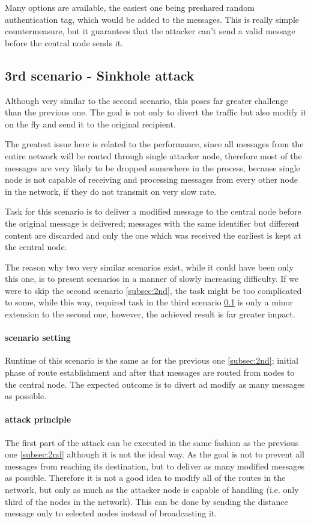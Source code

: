 \documentclass[
  digital, %
  table,   %
  nolof,     %
  nolot,     %
           oneside
]{fithesis3}
\begin{document}
    Many options are available, the easiest one being preshared random authentication tag, which would be added to the messages. This is really simple countermeasure, but it guarantees that the attacker can't send a valid message before the central node sends it.

    \subsection{3rd scenario - Sinkhole attack}\label{subsec:3rd}
    Although very similar to the second scenario, this poses far greater   challenge than the previous one. The goal is not only to divert the traffic but also modify it on the fly and send it to the original recipient.

    The greatest issue here is related to the performance, since all messages from the entire network will be routed through single attacker node, therefore most of the messages are very likely to be dropped somewhere in the process, because single node is not capable of receiving and processing messages from every other node in the network, if they do not transmit on very slow rate.

    Task for this scenario is to deliver a modified message to the central node before the original message is delivered; messages with the same identifier but different content are discarded and only the one which was received the earliest is kept at the central node.

    The reason why two very similar scenarios exist, while it could have been only this one, is to present scenarios in a manner of slowly increasing difficulty. If we were to skip the second scenario \ref{subsec:2nd}, the task might be too complicated to some, while this way, required task in the third scenario \ref{subsec:3rd} is only a minor extension to the second one, however, the achieved result is far greater impact.

    \paragraph{scenario setting}
    Runtime of this scenario is the same as for the previous one \ref{subsec:2nd}; initial phase of route establishment and after that messages are routed from nodes to the central node. The expected outcome is to divert ad modify as many messages as possible.

    \paragraph{attack principle}
    The first part of the attack can be executed in the same fashion as the previous one \ref{subsec:2nd} although it is not the ideal way. As the goal is not to prevent all messages from reaching its destination, but to deliver as many modified messages as possible. Therefore it is not a good idea to modify all of the routes in the network, but only as much as the attacker node is capable of handling (i.e. only third of the nodes in the network). This can be done by sending the distance message only to selected nodes instead of broadcasting it.
\end{document}
